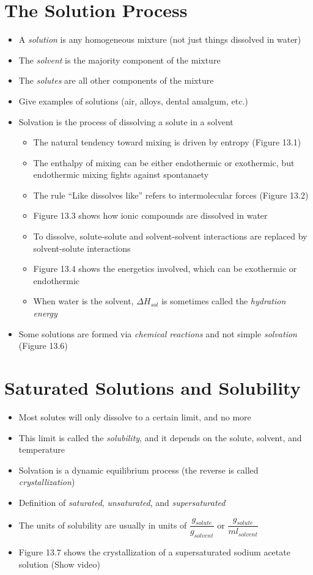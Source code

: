 \documentclass[12pt, openany, letterpaper]{memoir}
\begin{document}
\section{The Solution Process}
\begin{itemize}
	\item A \emph{solution} is any homogeneous mixture (not just things dissolved in water)
	\item The \emph{solvent} is the majority component of the mixture
	\item The \emph{solutes} are all other components of the mixture
	\item Give examples of solutions (air, alloys, dental amalgum, etc.)
	\item Solvation is the process of dissolving a solute in a solvent
	\begin{itemize}
    \item The natural tendency toward mixing is driven by entropy (Figure 13.1)
    \item The enthalpy of mixing can be either endothermic or exothermic, but endothermic mixing fights against spontanaety
		\item The rule ``Like dissolves like'' refers to intermolecular forces (Figure 13.2)
		\item Figure 13.3 shows how ionic compounds are dissolved in water
		\item To dissolve, solute-solute and solvent-solvent interactions are replaced by solvent-solute interactions
		\item Figure 13.4 shows the energetics involved, which can be exothermic or endothermic
		\item When water is the solvent, $\Delta H_{sol}$ is sometimes called the \emph{hydration energy}		
	\end{itemize}
  \item Some solutions are formed via \emph{chemical reactions} and not simple \emph{solvation} (Figure 13.6)
\end{itemize}

\section{Saturated Solutions and Solubility}
\begin{itemize}
	\item Most solutes will only dissolve to a certain limit, and no more
	\item This limit is called the \emph{solubility}, and it depends on the solute, solvent, and temperature
  \item Solvation is a dynamic equilibrium process (the reverse is called \emph{crystallization})
  \item Definition of \emph{saturated}, \emph{unsaturated}, and \emph{supersaturated}
	\item The units of solubility are usually in units of $\dfrac{g_{solute}}{g_{solvent}}$ or $\dfrac{g_{solute}}{ml_{solvent}}$
  \item Figure 13.7 shows the crystallization of a supersaturated sodium acetate solution (Show video)
\end{itemize}
\end{document}

